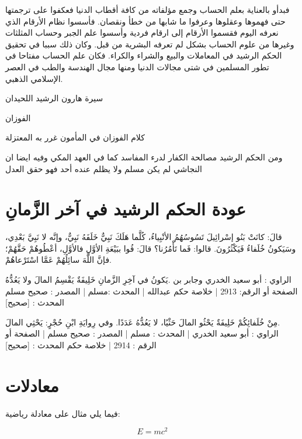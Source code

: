 فبدأو بالعناية بعلم الحساب وجمع مؤلفاته من كافة أقطاب الدنيا فعكفوا على ترجمتها حتى فهموها وعقلوها وعرفوا ما شابها من خطأ ونقصان. فأسسوا نظام الأرقام الذي نعرفه اليوم فقسموا الأرقام إلى ارقام فردية وأسسوا علم الجبر وحساب المثلثات وغيرها من علوم الحساب بشكل لم تعرفه البشرية من قبل. وكان ذلك سببا في تحقيق الحكم الرشيد في المعاملات والبيع والشراء والكراء. فكان علم الحساب مفتاحا في تطور المسلمين في شتى مجالات الدنيا ومنها مجال الهندسة والطب في العصر الإسلامي الذهبي.


سيرة هارون الرشيد
اللحيدان

الفوزان


كلام الفوزان في المأمون
غرر به المعتزلة

ومن الحكم الرشيد مصالحة الكفار لدرء المفاسد كما في العهد المكي
وفيه ايضا ان النجاشي لم يكن مسلم ولا  يظلم عنده أحد فهو حقق العدل



\section{عودة الحكم الرشيد في آخر الزَّمانِ}

قالَ: كانَتْ بَنُو إسْرائِيلَ تَسُوسُهُمُ الأنْبِياءُ، كُلَّما هَلَكَ نَبِيٌّ خَلَفَهُ نَبِيٌّ، وإنَّه لا نَبِيَّ بَعْدِي، وسَيَكونُ خُلَفاءُ فَيَكْثُرُونَ. قالوا: فَما تَأْمُرُنا؟ قالَ: فُوا ببَيْعَةِ الأوَّلِ فالأوَّلِ، أعْطُوهُمْ حَقَّهُمْ؛ فإنَّ اللَّهَ سائِلُهُمْ عَمَّا اسْتَرْعاهُمْ.

‎يَكونُ في آخِرِ الزَّمانِ خَلِيفَةٌ يَقْسِمُ المالَ ولا يَعُدُّهُ.
‎الراوي : أبو سعيد الخدري وجابر بن عبدالله | المحدث :مسلم | المصدر : صحيح مسلم
‎الصفحة أو الرقم: 2913 | خلاصة حكم المحدث : [صحيح]


‎مِنْ خُلَفائِكُمْ خَلِيفَةٌ يَحْثُو المالَ حَثْيًا، لا يَعُدُّهُ عَدَدًا. وفي رِوايَةِ ابْنِ حُجْرٍ: يَحْثِي المالَ.
‎الراوي : أبو سعيد الخدري | المحدث : مسلم | المصدر : صحيح مسلم | الصفحة أو الرقم : 2914 | خلاصة حكم المحدث : [صحيح]
   





\section{معادلات}
فيما يلي مثال على معادلة رياضية:

\begin{equation}
    E = mc^2
\end{equation}

